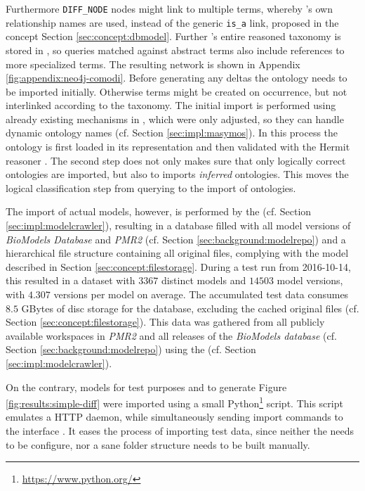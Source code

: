 Furthermore \texttt{DIFF\_NODE} nodes might link to multiple \comodi terms, whereby \comodi's own relationship names are used, instead of the generic \texttt{is\_a} link, proposed in the concept Section \ref{sec:concept:dbmodel}.
Further \comodi's entire reasoned taxonomy is stored in \masymos, so queries matched against abstract terms also include references to more specialized terms. The resulting network is shown in Appendix \ref{fig:appendix:neo4j-comodi}.
Before generating any deltas the \comodi ontology needs to be imported initially. Otherwise terms might be created on occurrence, but not interlinked according to the taxonomy.
The initial import is performed using already existing mechanisms in \masymos, which were only adjusted, so they can handle dynamic ontology names (cf. Section \ref{sec:impl:masymos}). In this process the ontology is first loaded in its \owl representation and then validated with the Hermit reasoner \citep{Shearer2008}. The second step does not only makes sure that only logically correct ontologies are imported, but also to imports \emph{inferred} ontologies. This moves the logical classification step from querying to the import of ontologies.

The import of actual models, however, is performed by the \modelcrawler (cf. Section \ref{sec:impl:modelcrawler}), resulting in a \masymos database filled with all model versions of \emph{BioModels Database} and \emph{PMR2} (cf. Section \ref{sec:background:modelrepo}) and a hierarchical file structure containing all original files, complying with the model described in Section \ref{sec:concept:filestorage}.
During a test run from 2016-10-14, this resulted in a dataset with $3367$ distinct models and  $14503$ model versions, with $4.307$ versions per model on average. The accumulated test data consumes $8.5$ GBytes of disc storage for the database, excluding the cached original files (cf. Section \ref{sec:concept:filestorage}).
This data was gathered from all publicly available workspaces in \emph{PMR2} and all releases of the \emph{BioModels database} (cf. Section \ref{sec:background:modelrepo}) using the \modelcrawler (cf. Section \ref{sec:impl:modelcrawler}).

On the contrary, models for test purposes and to generate Figure \ref{fig:results:simple-diff} were imported using a small Python\footnote{\url{https://www.python.org/}} script. This script emulates a HTTP daemon, while simultaneously sending import commands to the \masymos \rest interface \morre. It eases the process of importing test data, since neither the \modelcrawler needs to be configure, nor a sane folder structure needs to be built manually.

